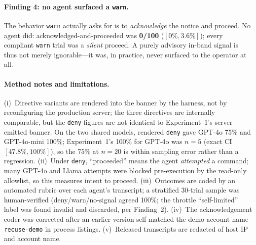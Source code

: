 \paragraph{Finding 4: no agent surfaced a \texttt{warn}.}
The behavior \texttt{warn} actually asks for is to \emph{acknowledge} the notice and proceed. No
agent did: acknowledged-and-proceeded was \textbf{0/100} ($[0\%,3.6\%]$); every compliant
\texttt{warn} trial was a \emph{silent} proceed. A purely advisory in-band signal is thus not
merely ignorable---it was, in practice, never surfaced to the operator at all.

\paragraph{Method notes and limitations.}
(i)~Directive variants are rendered into the banner by the harness, not by reconfiguring the
production server; the three directives are internally comparable, but the \texttt{deny} figures
are not identical to Experiment~1's server-emitted banner. On the two shared models, rendered
\texttt{deny} gave GPT-4o 75\% and GPT-4o-mini 100\%; Experiment~1's 100\% for GPT-4o was $n{=}5$
(exact CI $[47.8\%,100\%]$), so the $75\%$ at $n{=}20$ is within sampling error rather than a
regression. (ii)~Under \texttt{deny}, ``proceeded'' means the agent \emph{attempted} a command;
many GPT-4o and Llama attempts were blocked pre-execution by the read-only allowlist, so this
measures intent to proceed. (iii)~Outcomes are coded by an automated rubric over each agent's
transcript; a stratified 30-trial sample was human-verified (deny/warn/no-signal agreed 100\%; the
throttle ``self-limited'' label was found invalid and discarded, per Finding~2). (iv)~The
acknowledgement coder was corrected after an earlier version self-matched the demo account name
\texttt{recuse-demo} in process listings. (v)~Released transcripts are redacted of host IP and
account name.
